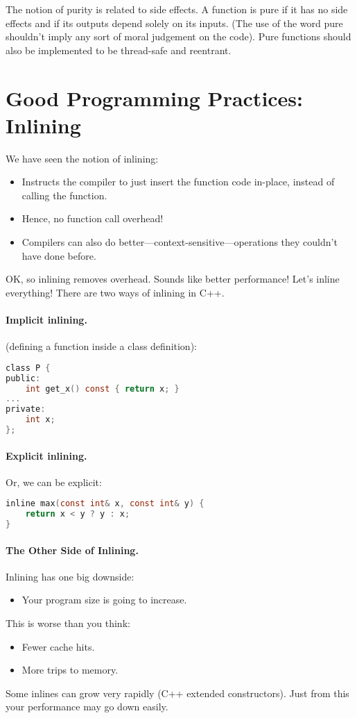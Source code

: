The notion of purity is related to side effects. A function is pure if it has no side effects and if its outputs depend solely on its inputs. (The use of the word pure shouldn't imply any sort of moral judgement on the code). Pure functions should also be implemented to be thread-safe and reentrant.


\section*{Good Programming Practices: Inlining}
We have seen the notion of inlining:
  \begin{itemize}
    \item Instructs the compiler to just insert the function code in-place,
      instead of calling the function.
    \item Hence, no function call overhead!
    \item Compilers can also do better---context-sensitive---operations they couldn't
      have done before.
  \end{itemize}

OK, so inlining removes overhead. Sounds like better performance! Let's inline everything!
There are two ways of inlining in C++.

\paragraph{Implicit inlining.} (defining a function inside a class definition):
  \begin{lstlisting}[language=C]
class P {
public:
    int get_x() const { return x; }
...
private:
    int x;
};
  \end{lstlisting}

\paragraph{Explicit inlining.} Or, we can be explicit:
  \begin{lstlisting}[language=C]
inline max(const int& x, const int& y) {
    return x < y ? y : x;
}
  \end{lstlisting}

\paragraph{The Other Side of Inlining.}
Inlining has one big downside:
  \begin{itemize}
    \item Your program size is going to increase.
  \end{itemize}
   This is worse than you think:
      \begin{itemize}
        \item Fewer cache hits.
        \item More trips to memory.
      \end{itemize}
   Some inlines can grow very rapidly (C++ extended constructors).
  Just from this your performance may go down easily.

